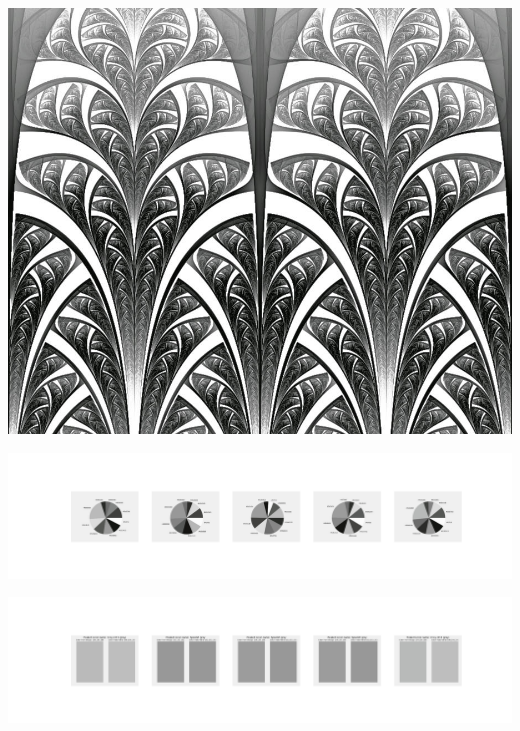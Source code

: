 \documentclass[11pt]{article}
\begin{document}
\begin{landscape}
    \begin{center}
    \includegraphics[width=\textwidth]{./nbimg/file (32).jpg}
    \end{center}

    \begin{center}
    \includegraphics[width=250mm]{./nbimg/pie-245.jpg}
    \end{center}

    \begin{center}
    \includegraphics[width=250mm]{./nbimg/peak-245.jpg}
    \end{center}
    


\end{landscape}
\end{document}
